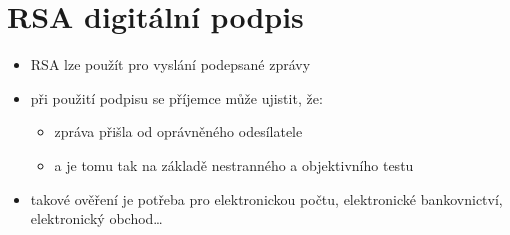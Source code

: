 \documentclass{szzclass}
\begin{document}
\section{RSA digitální podpis}
\begin{itemize}
    \item RSA lze použít pro vyslání podepsané zprávy
    \item při použití podpisu se příjemce může ujistit, že:
    \begin{itemize}
        \item zpráva přišla od oprávněného odesílatele
        \item a je tomu tak na základě nestranného a objektivního testu
    \end{itemize}
    \item takové ověření je potřeba pro elektronickou počtu, elektronické bankovnictví, elektronický obchod\dots
\end{itemize}
\end{document}
